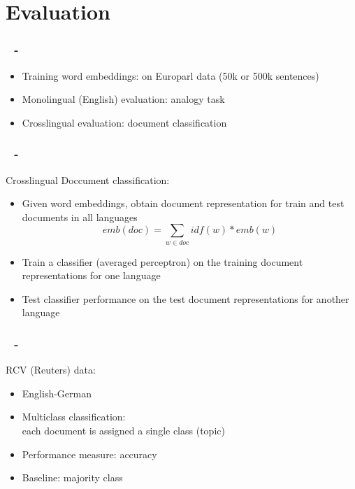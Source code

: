 \documentclass{beamer}
\newenvironment{dia}
{
\begin{frame}[fragile, environment=dia]
\frametitle{\insertsection
\ifx\insertsubsection\empty\else
      \,~-~\insertsubsection             %
   \fi}
}
{
\end{frame}
}
\begin{document}
\section{Evaluation}
\begin{dia}
\begin{itemize}
\item Training word embeddings: on Europarl data (50k or 500k sentences)
\item Monolingual (English) evaluation: analogy task
\item Crosslingual evaluation: document classification
\end{itemize}
\end{dia}




\begin{dia}
Crosslingual Doccument classification:
\begin{itemize}
\item Given word embeddings, obtain document representation for train and test documents in all languages
\begin{equation*}
emb(doc)=\sum_{w\in doc} idf(w)*emb(w)
\end{equation*}
\item Train a classifier (averaged perceptron) on the training document representations for one language
\item Test classifier performance on the test document representations for another language
\end{itemize}
\end{dia}



\begin{dia}
RCV (Reuters) data:
\begin{itemize}
\item English-German
\item Multiclass classification: \\
each document is assigned a single class (topic)
\item Performance measure: accuracy
\item Baseline: majority class
\end{itemize}
\end{dia}
\end{document}
